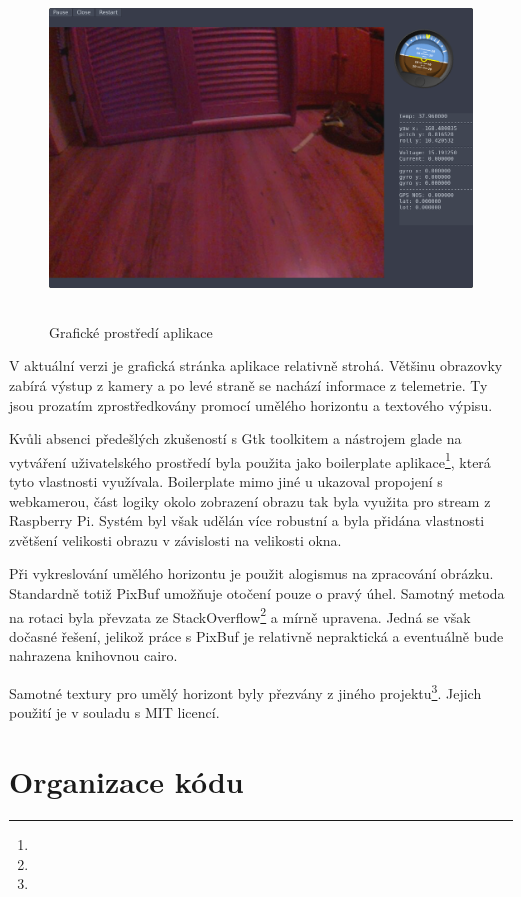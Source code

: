 \documentclass[a4paper,oneside,12pt]{report}
\begin{document}
\begin{figure}[h]
  \centering
  \includegraphics[height=9cm]{../img/interface.png}
  \caption[Grafické prostředí aplikace]{Grafické prostředí aplikace}
\end{figure}

V aktuální verzi je grafická stránka aplikace relativně strohá.
Většinu obrazovky zabírá výstup z kamery a po levé straně se nachází informace z telemetrie.
Ty jsou prozatím zprostředkovány promocí umělého horizontu a textového výpisu.

Kvůli absenci předešlých zkušeností s Gtk toolkitem a nástrojem glade na vytváření uživatelského prostředí byla použita jako boilerplate aplikace\footnote{}, která tyto vlastnosti využívala.
Boilerplate mimo jiné u ukazoval propojení s webkamerou, část logiky okolo zobrazení obrazu tak byla využita pro stream z Raspberry Pi.
Systém byl však udělán více robustní a byla přidána vlastnosti zvětšení velikosti obrazu v závislosti na velikosti okna.

Při vykreslování umělého horizontu je použit alogismus na zpracování obrázku.
Standardně totiž PixBuf umožňuje otočení pouze o pravý úhel.
Samotný metoda na rotaci byla převzata ze StackOverflow\footnote{} a mírně upravena.
Jedná se však dočasné řešení, jelikož práce s PixBuf je relativně nepraktická a eventuálně bude nahrazena knihovnou cairo.

Samotné textury pro umělý horizont byly přezvány z jiného projektu\footnote{}.
Jejich použití je v souladu s MIT licencí.

\section{Organizace kódu}
\end{document}

